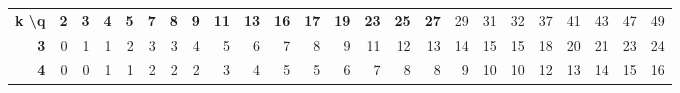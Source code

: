\begin{table}[ht]
\centering
\tiny
\begin{tabular}{|r|rrrrrrrrrrrrrrrrrrrrrrr}
\cline{1-24}
\multicolumn{1}{|l|}{\textbf{k \textbackslash q}} & \multicolumn{1}{r|}{\textbf{2}} & \multicolumn{1}{r|}{\textbf{3}} & \multicolumn{1}{r|}{\textbf{4}} & \multicolumn{1}{r|}{\textbf{5}} & \multicolumn{1}{r|}{\textbf{7}} & \multicolumn{1}{r|}{\textbf{8}} & \multicolumn{1}{r|}{\textbf{9}} & \multicolumn{1}{r|}{\textbf{11}} & \multicolumn{1}{r|}{\textbf{13}} & \multicolumn{1}{r|}{\textbf{16}} & \multicolumn{1}{r|}{\textbf{17}} & \multicolumn{1}{r|}{\textbf{19}} & \multicolumn{1}{r|}{\textbf{23}} &

\multicolumn{1}{r|}{\textbf{25}} &
\multicolumn{1}{r|}{\textbf{27}} &
\multicolumn{1}{r|}{29} &
\multicolumn{1}{r|}{31}    &
\multicolumn{1}{r|}{32}    & \multicolumn{1}{r|}{37}    & \multicolumn{1}{r|}{41}    & \multicolumn{1}{r|}{43}    & \multicolumn{1}{r|}{47}    & \multicolumn{1}{r|}{49}    \\ \cline{1-16} \cline{18-24} 
\textbf{3}                                        & \cellcolor[HTML]{FFFFFF}0       & \cellcolor[HTML]{FFFFFF}1       & \cellcolor[HTML]{FFFFFF}1       & \cellcolor[HTML]{FBEAE8}2       & \cellcolor[HTML]{F7D4D1}3       & \cellcolor[HTML]{F7D4D1}3       & \cellcolor[HTML]{F3BEB9}4       & \cellcolor[HTML]{F3BAB5}5        & \cellcolor[HTML]{F3B5B0}6        & \cellcolor[HTML]{F2B1AB}7        & \cellcolor[HTML]{F2ACA6}8        & \cellcolor[HTML]{F2A8A1}9        & \cellcolor[HTML]{F19F97}11       & \cellcolor[HTML]{F19A92}12       & \cellcolor[HTML]{F1968E}13       & \cellcolor[HTML]{F09189}14 & \cellcolor[HTML]{F08C84}15 & \cellcolor[HTML]{F08C84}15 & \cellcolor[HTML]{EF7F75}18 & \cellcolor[HTML]{EE766B}20 & \cellcolor[HTML]{EE7166}21 & \cellcolor[HTML]{ED685D}23 & \cellcolor[HTML]{ED6358}24 \\ \cline{1-1}
\textbf{4}                                        & \cellcolor[HTML]{FFFFFF}0       & \cellcolor[HTML]{FFFFFF}0       & \cellcolor[HTML]{FFFFFF}1       & \cellcolor[HTML]{FFFFFF}1       & \cellcolor[HTML]{FBEAE8}2       & \cellcolor[HTML]{FBEAE8}2       & \cellcolor[HTML]{FBEAE8}2       & \cellcolor[HTML]{F7D4D1}3        & \cellcolor[HTML]{F3BEB9}4        & \cellcolor[HTML]{F3BAB5}5        & \cellcolor[HTML]{F3BAB5}5        & \cellcolor[HTML]{F3B5B0}6        & \cellcolor[HTML]{F2B1AB}7        & \cellcolor[HTML]{F2ACA6}8        & \cellcolor[HTML]{F2ACA6}8        & \cellcolor[HTML]{F2A8A1}9  & \cellcolor[HTML]{F1A39C}10 & \cellcolor[HTML]{F1A39C}10 & \cellcolor[HTML]{F19A92}12 & \cellcolor[HTML]{F1968E}13 & \cellcolor[HTML]{F09189}14 & \cellcolor[HTML]{F08C84}15 & \cellcolor[HTML]{EF887F}16 \\ \cline{1-1}

\end{tabular}
\end{table}
